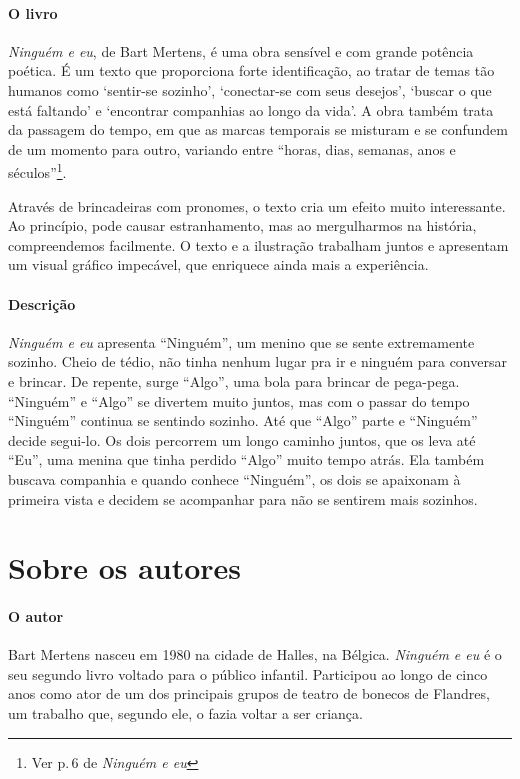\documentclass[11pt]{extarticle}
\begin{document}
\paragraph{O livro} \textit{Ninguém e eu}, de Bart Mertens, é uma obra sensível e com grande potência poética. É um texto que 
proporciona forte identificação, ao tratar de temas tão humanos como `sentir-se sozinho', `conectar-se com seus desejos', `buscar o que está faltando' e `encontrar companhias ao longo da vida'. A obra também trata da passagem do tempo, em que as marcas temporais se misturam e se confundem de um momento para outro, variando entre ``horas, dias, semanas, anos e séculos''\footnote{Ver p.\,6 de \textit{Ninguém e eu}}.

Através de brincadeiras com pronomes, o texto cria um efeito muito interessante. Ao princípio, pode causar estranhamento, mas ao mergulharmos na história, compreendemos facilmente. O texto e a ilustração trabalham juntos e apresentam um visual gráfico impecável, que enriquece ainda mais a experiência. 


\paragraph{Descrição} \textit{Ninguém e eu} apresenta ``Ninguém'', um menino que se sente extremamente sozinho. Cheio de tédio, não tinha nenhum lugar pra ir e ninguém para conversar e brincar. De repente, surge ``Algo'', uma bola para brincar de pega-pega. ``Ninguém'' e ``Algo'' se divertem muito juntos, mas com o passar do tempo ``Ninguém'' continua se sentindo sozinho. Até que ``Algo'' parte e ``Ninguém'' decide segui-lo. Os dois percorrem um longo caminho juntos, que os leva até ``Eu'', uma menina que tinha perdido ``Algo'' muito tempo atrás. Ela também buscava companhia e quando conhece ``Ninguém'', os dois se apaixonam à primeira vista e decidem se acompanhar para não se sentirem mais sozinhos.

\section{Sobre os autores}

\paragraph{O autor} Bart Mertens nasceu em 1980 na cidade de Halles, na Bélgica. \textit{Ninguém e eu} é o seu segundo livro voltado para o público infantil. Participou ao longo de cinco anos como ator de um dos principais grupos de teatro de bonecos de Flandres, um trabalho que, segundo ele, o fazia voltar a ser criança. 
\end{document}

